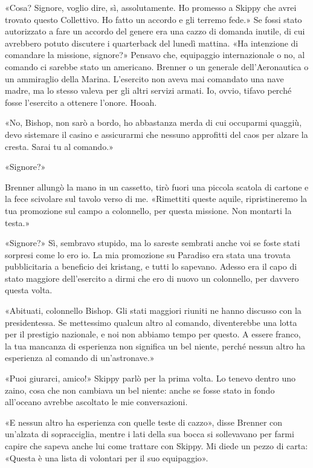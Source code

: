 «Cosa? Signore, voglio dire, sì, assolutamente. Ho promesso a Skippy che
avrei trovato questo Collettivo. Ho fatto un accordo e gli terremo
fede.» Se fossi stato autorizzato a fare un accordo del genere era una
cazzo di domanda inutile, di cui avrebbero potuto discutere i
quarterback del lunedì mattina. «Ha intenzione di comandare la missione,
signore?» Pensavo che, equipaggio internazionale o no, al comando ci
sarebbe stato un americano. Brenner o un generale dell'Aeronautica o un
ammiraglio della Marina. L'esercito non aveva mai comandato una nave
madre, ma lo stesso valeva per gli altri servizi armati. Io, ovvio,
tifavo perché fosse l'esercito a ottenere l'onore. Hooah.

«No, Bishop, non sarò a bordo, ho abbastanza merda di cui occuparmi
quaggiù, devo sistemare il casino e assicurarmi che nessuno approfitti
del caos per alzare la cresta. Sarai tu al comando.»

«Signore?»

Brenner allungò la mano in un cassetto, tirò fuori una piccola scatola
di cartone e la fece scivolare sul tavolo verso di me. «Rimettiti queste
aquile, ripristineremo la tua promozione sul campo a colonnello, per
questa missione. Non montarti la testa.»

«Signore?» Sì, sembravo stupido, ma lo sareste sembrati anche voi se
foste stati sorpresi come lo ero io. La mia promozione su Paradiso era
stata una trovata pubblicitaria a beneficio dei kristang, e tutti lo
sapevano. Adesso era il capo di stato maggiore dell'esercito a dirmi che
ero di nuovo un colonnello, per davvero questa volta.

«Abituati, colonnello Bishop. Gli stati maggiori riuniti ne hanno
discusso con la presidentessa. Se mettessimo qualcun altro al comando,
diventerebbe una lotta per il prestigio nazionale, e noi non abbiamo
tempo per questo. A essere franco, la tua mancanza di esperienza non
significa un bel niente, perché nessun altro ha esperienza al comando di
un'astronave.»

«Puoi giurarci, amico!» Skippy parlò per la prima volta. Lo tenevo
dentro uno zaino, cosa che non cambiava un bel niente: anche se fosse
stato in fondo all'oceano avrebbe ascoltato le mie conversazioni.

«E nessun altro ha esperienza con quelle teste di cazzo», disse Brenner
con un'alzata di sopracciglia, mentre i lati della sua bocca si
sollevavano per farmi capire che sapeva anche lui come trattare con
Skippy. Mi diede un pezzo di carta: «Questa è una lista di volontari per
il suo equipaggio».


